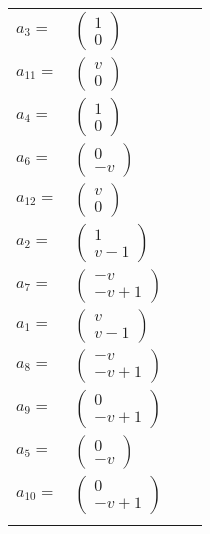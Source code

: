 \documentclass[1p]{elsarticle_modified}
\theoremstyle{definition}
\begin{document}
\begin{tabular}{m{7pt} m{180pt} m{7pt} m{180pt} }
\flushright $a_{3}=$&$\begin{pmatrix}1\\0\end{pmatrix}$ \\
\flushright $a_{11}=$&$\begin{pmatrix}v\\0\end{pmatrix}$ \\
\flushright $a_{4}=$&$\begin{pmatrix}1\\0\end{pmatrix}$ \\
\flushright $a_{6}=$&$\begin{pmatrix}0\\- v\end{pmatrix}$ \\
\flushright $a_{12}=$&$\begin{pmatrix}v\\0\end{pmatrix}$ \\
\flushright $a_{2}=$&$\begin{pmatrix}1\\v-1\end{pmatrix}$ \\
\flushright $a_{7}=$&$\begin{pmatrix}- v\\- v+1\end{pmatrix}$ \\
\flushright $a_{1}=$&$\begin{pmatrix}v\\v-1\end{pmatrix}$ \\
\flushright $a_{8}=$&$\begin{pmatrix}- v\\- v+1\end{pmatrix}$ \\
\flushright $a_{9}=$&$\begin{pmatrix}0\\- v+1\end{pmatrix}$ \\
\flushright $a_{5}=$&$\begin{pmatrix}0\\- v\end{pmatrix}$ \\
\flushright $a_{10}=$&$\begin{pmatrix}0\\- v+1\end{pmatrix}$\\&\end{tabular}
\end{document}
